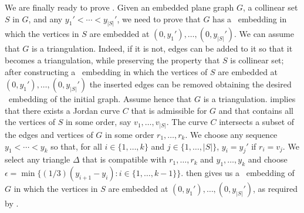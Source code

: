 We are finally ready to prove . Given an embedded plane graph $G$, a collinear set $S$ in $G$,
	and any $y_1'<\cdots<y_{|S|}'$, we need to prove that $G$ has
	a \Fary\ embedding in which the vertices in $S$ are embedded at
	$(0,y_1'),\ldots,(0,y_{|S|}')$. We can assume that $G$ is a triangulation. Indeed, if it is not,  edges can be added to it so that it becomes a triangulation, while preserving the property that $S$ is collinear set; after constructing a \Fary\ embedding in which the vertices of $S$ are embedded at $(0,y_1'),\ldots,(0,y_{|S|}')$ the inserted edges can be removed obtaining the desired \Fary\ embedding of the initial graph. Assume hence that $G$ is a triangulation. 	  implies
	that there exists a Jordan curve $C$ that is admissible for $G$
	and that contains all the vertices of $S$ in some order, say
	$v_1,\ldots,v_{|S|}$.  The curve $C$ intersects a subset of the edges
	and vertices of $G$ in some order $r_1,\ldots,r_k$.  We choose any
	sequence $y_1<\cdots<y_k$ so that, for all $i\in\{1,\ldots,k\}$ and
	$j\in\{1,\ldots,|S|\}$, $y_i = y_j'$ if $r_i=v_j$.  We select
	any triangle $\Delta$ that is compatible with $r_1,\ldots,r_k$ and
	$y_1,\ldots,y_k$ and choose $\epsilon = \min\{(1/3)(y_{i+1}-y_{i}):
	i\in\{1,\ldots,k-1\}\}$.   then gives us a \Fary\
	embedding of $G$ in which the vertices in $S$ are embedded at $(0,y_1'),\ldots,(0,y_{|S|}')$, as required by .









